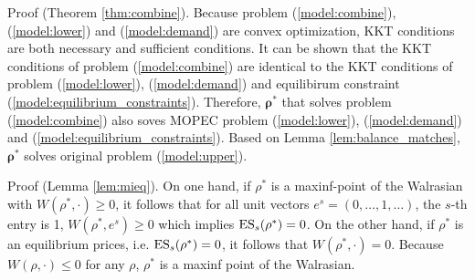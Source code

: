 \state Proof (Theorem \ref{thm:combine}).
Because problem (\ref{model:combine}), (\ref{model:lower}) and (\ref{model:demand}) are convex optimization, KKT conditions are both necessary and sufficient conditions. It can be shown that the KKT conditions of problem (\ref{model:combine}) are identical to the KKT conditions of problem (\ref{model:lower}), (\ref{model:demand}) and equilibirum constraint (\ref{model:equilibrium_constraints}). Therefore, $\bm{\rho}^{\ast}$ that solves problem (\ref{model:combine}) also soves MOPEC problem (\ref{model:lower}), (\ref{model:demand}) and (\ref{model:equilibrium_constraints}). Based on Lemma \ref{lem:balance_matches},  $\bm{\rho}^{\ast}$ solves original problem (\ref{model:upper}).

\eop


\state Proof (Lemma \ref{lem:mieq}).
On one hand, if $\rho^*$ is a maxinf-point of the Walrasian with $W(\rho^*,\cdot) \geq 0$, 
it follows that for all unit vectors $e^s=(0,\ldots,1,\ldots)$, the $s$-th 
entry is 1, $W(\rho^*,e^s) \geq 0$ which implies ${\rm ES}_s(\rho^*) = 0$. On the other hand, if $\rho^*$ is an equilibrium prices, i.e. ${\rm ES}_s(\rho^*) = 0$, it follows that $W(\rho^*,\cdot) = 0$. Because $W(\rho,\cdot) \leq 0$ for any $\rho$, $\rho^*$ is a maxinf point of the Walrasian.

\eop

